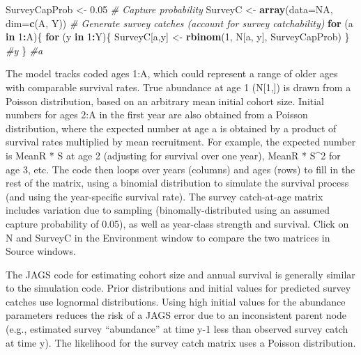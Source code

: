 \documentclass[
]{krantz}
\makeatletter
\newenvironment{Shaded}{\begin{snugshade}}{\end{snugshade}}
\newcommand{\AttributeTok}[1]{\textcolor[rgb]{0.27,0.27,0.27}{#1}}
\newcommand{\CommentTok}[1]{\textcolor[rgb]{0.37,0.37,0.37}{\textit{#1}}}
\newcommand{\ConstantTok}[1]{\textcolor[rgb]{0.37,0.37,0.37}{#1}}
\newcommand{\ControlFlowTok}[1]{\textcolor[rgb]{0.27,0.27,0.27}{\textbf{#1}}}
\newcommand{\DecValTok}[1]{\textcolor[rgb]{0.06,0.06,0.06}{#1}}
\newcommand{\FloatTok}[1]{\textcolor[rgb]{0.06,0.06,0.06}{#1}}
\newcommand{\FunctionTok}[1]{\textcolor[rgb]{0.27,0.27,0.27}{\textbf{#1}}}
\newcommand{\NormalTok}[1]{#1}
\newcommand{\OtherTok}[1]{\textcolor[rgb]{0.37,0.37,0.37}{#1}}
\newcommand{\SpecialCharTok}[1]{\textcolor[rgb]{0.43,0.43,0.43}{\textbf{#1}}}
\newenvironment{kframe}{%
\medskip{}
\setlength{\fboxsep}{.8em}
 \def\at@end@of@kframe{}%
 \ifinner\ifhmode%
  \def\at@end@of@kframe{\end{minipage}}%
  \begin{minipage}{\columnwidth}%
 \fi\fi%
 \def\FrameCommand##1{\hskip\@totalleftmargin \hskip-\fboxsep
 \colorbox{shadecolor}{##1}\hskip-\fboxsep
     \hskip-\linewidth \hskip-\@totalleftmargin \hskip\columnwidth}%
 \MakeFramed {\advance\hsize-\width
   \@totalleftmargin\z@ \linewidth\hsize
   \@setminipage}}%
 {\par\unskip\endMakeFramed%
 \at@end@of@kframe}
\renewenvironment{Shaded}{\begin{kframe}}{\end{kframe}}
\makeatother
\begin{document}
\begin{Shaded}
\begin{Highlighting}[]
\NormalTok{SurveyCapProb }\OtherTok{\textless{}{-}} \FloatTok{0.05} \CommentTok{\# Capture probability}
\NormalTok{SurveyC }\OtherTok{\textless{}{-}} \FunctionTok{array}\NormalTok{(}\AttributeTok{data=}\ConstantTok{NA}\NormalTok{, }\AttributeTok{dim=}\FunctionTok{c}\NormalTok{(A, Y))}
\CommentTok{\# Generate survey catches (account for survey catchability)}
\ControlFlowTok{for}\NormalTok{ (a }\ControlFlowTok{in} \DecValTok{1}\SpecialCharTok{:}\NormalTok{A)\{}
  \ControlFlowTok{for}\NormalTok{ (y }\ControlFlowTok{in} \DecValTok{1}\SpecialCharTok{:}\NormalTok{Y)\{}
\NormalTok{    SurveyC[a,y] }\OtherTok{\textless{}{-}} \FunctionTok{rbinom}\NormalTok{(}\DecValTok{1}\NormalTok{, N[a, y], SurveyCapProb)}
\NormalTok{  \} }\CommentTok{\#y}
\NormalTok{\} }\CommentTok{\#a}
\end{Highlighting}
\end{Shaded}

The model tracks coded ages 1:A, which could represent a range of older ages with comparable survival rates. True abundance at age 1 (N{[}1,{]}) is drawn from a Poisson distribution, based on an arbitrary mean initial cohort size. Initial numbers for ages 2:A in the first year are also obtained from a Poisson distribution, where the expected number at age a is obtained by a product of survival rates multiplied by mean recruitment. For example, the expected number is MeanR * S at age 2 (adjusting for survival over one year), MeanR * S\^{}2 for age 3, etc. The code then loops over years (columns) and ages (rows) to fill in the rest of the matrix, using a binomial distribution to simulate the survival process (and using the year-specific survival rate). The survey catch-at-age matrix includes variation due to sampling (binomally-distributed using an assumed capture probability of 0.05), as well as year-class strength and survival. Click on N and SurveyC in the Environment window to compare the two matrices in Source windows.

The JAGS code for estimating cohort size and annual survival is generally similar to the simulation code. Prior distributions and initial values for predicted survey catches use lognormal distributions. Using high initial values for the abundance parameters reduces the risk of a JAGS error due to an inconsistent parent node (e.g., estimated survey ``abundance'' at time y-1 less than observed survey catch at time y). The likelihood for the survey catch matrix uses a Poisson distribution.
\end{document}
